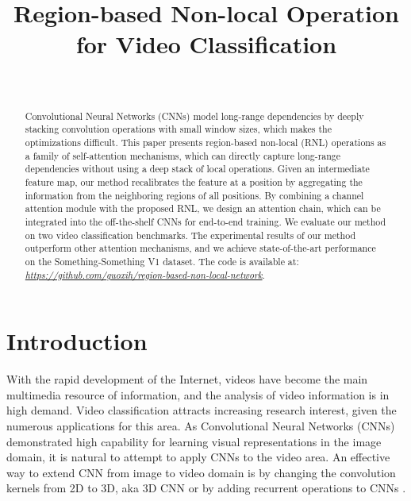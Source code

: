 \documentclass[a4paper,conference]{IEEEtran}
\begin{document}
\title{Region-based Non-local Operation\\ 
for Video Classification}



\author{ \\
}


\maketitle



\begin{abstract}
Convolutional Neural Networks (CNNs) model long-range dependencies by deeply stacking convolution operations with small window sizes, which makes the optimizations difficult. This paper presents region-based non-local (RNL) operations as a family of self-attention mechanisms, which can directly capture long-range dependencies without using a deep stack of local operations. Given an intermediate feature map, our method recalibrates the feature at a position by aggregating the information from the neighboring regions of all positions. By combining a channel attention module with the proposed RNL, we design an attention chain, which can be integrated into the off-the-shelf CNNs for end-to-end training. We evaluate our method on two video classification benchmarks. The experimental results of our method outperform other attention mechanisms, and we achieve state-of-the-art performance on the Something-Something V1 dataset. The code is available at: \href{https://github.com/guoxih/region-based-non-local-network}{\textit{https://github.com/guoxih/region-based-non-local-network}}.
\end{abstract}

\IEEEpeerreviewmaketitle


\section{Introduction}
\label{sec:intro}

With the rapid development of the Internet, videos have become the main multimedia resource of information, and the analysis of video information is in high demand. Video classification attracts increasing research interest, given the numerous applications for this area. As Convolutional Neural Networks (CNNs) demonstrated high capability for learning visual representations in the image domain, it is natural to attempt to apply CNNs to the video area. An effective way to extend CNN from image to video domain is by changing the convolution kernels from 2D to 3D, aka 3D CNN \cite{tran2015learning,carreira2017quo} or by adding recurrent operations to CNNs \cite{yue2015beyond,donahue2015long}.
\end{document}

